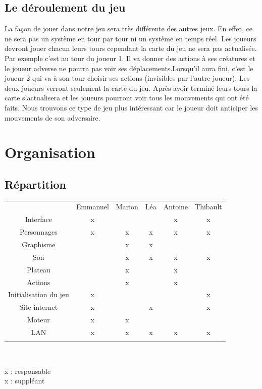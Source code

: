 \documentclass[12pt]{extarticle}
\begin{document}
\subsection{Le déroulement du jeu}

La façon de jouer dans notre jeu sera très différente des autres jeux. En effet, ce ne sera pas un système en tour par tour ni un système en temps réel. Les joueurs devront jouer chacun leurs tours cependant la carte du jeu ne sera pas actualisée. Par exemple c’est au tour du joueur 1. Il va donner des actions à ses créatures et le joueur adverse ne pourra pas voir ses déplacements.Lorsqu’il aura fini, c’est le joueur 2 qui va à son tour choisir ses actions (invisibles par l’autre joueur). Les deux joueurs verront seulement la carte du jeu. Après avoir terminé leurs tours la carte s’actualisera et les joueurs pourront voir tous les mouvements qui ont été faits. Nous trouvons ce type de jeu plus intéressant car le joueur doit anticiper les mouvements de son adversaire. 

\section{Organisation}

\subsection{Répartition}

\begin{table}[!ht]
	\begin{center}
		\begin{tabular}{ | c || c | c | c | c | c | }
			\cline{2-6} \multicolumn{1}{c|}{}& Emmanuel & Marion & Léa & Antoine & Thibault \\ \hhline{-::=:=:=:=:=:}
			 Interface & x &&& \color{red} x & x \\ \hhline{-||-----|}
			 Personnages & x & x & \color{red} x & x & x \\ \hhline{-||-----|}
			 Graphisme && x & \color{red} x && \\ \hhline{-||-----|}
			 Son && x & x & x & \color{red} x \\ \hhline{-||-----|}
			 Plateau && \color{red} x && x & \\ \hhline{-||-----|}
			 Actions && x && \color{red} x & \\ \hhline{-||-----|}
			 Initialisation du jeu & \color{red} x &&&& x \\ \hhline{-||-----|}
			 Site internet & x && x && \color{red} x \\ \hhline{-||-----|}
			 Moteur & \color{red} x & \color{red} x &&& \\ \hhline{-||-----|}
			 LAN & x & x & x & x & \color{red} x \\ \hhline{-||-----|}
		\end{tabular}\\ 
	\end{center}
	\vspace{1cm}
	\textcolor{red}{x} : responsable\\
	x : suppléant
\end{table}
\end{document}

